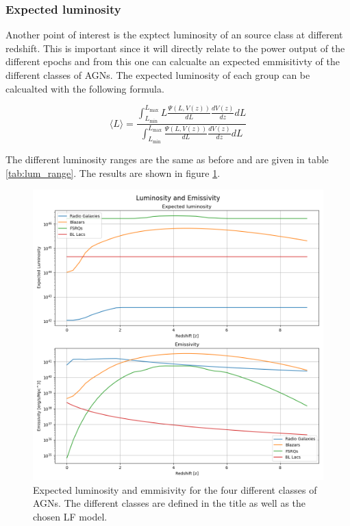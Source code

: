 \documentclass{article}
\begin{document}
\subsubsection{Expected luminosity}
Another point of interest is the exptect luminosity of an source class at different redshift. This is important since it will directly relate to the 
power output of the different epochs and from this one can calcualte an expected emmisitivty of the different classes of AGNs. 
The expected luminosity of each group can be calcualted with the following formula. 

\begin{equation}
    \langle L \rangle = \frac{\int_{L_{\text{min}}}^{L_{\text{max}}} L \frac{\Psi(L, V(z))}{dL} \frac{dV(z)}{dz} dL}{\int_{L_{\text{min}}}^{L_{\text{max}}} \frac{\Psi(L, V(z))}{dL} \frac{dV(z)}{dz} dL}
\end{equation}

The different luminosity ranges are the same as before and are given in table \ref{tab:lum_range}. The results are shown in figure \ref{fig:EL}.

\begin{figure}
    \centering
    \includegraphics[width = \textwidth]{Luminosity and Emissivity.png}
    \caption{Expected luminosity and emmisivity for the four different classes of AGNs. The different classes are defined in the title as well as the chosen LF model.}
    \label{fig:EL}
\end{figure}
\end{document}
